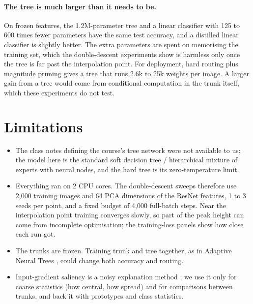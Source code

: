 \paragraph{The tree is much larger than it needs to be.} On frozen features, the 1.2M-parameter tree and a linear classifier with 125 to 600 times fewer parameters have the same test accuracy, and a distilled linear classifier is slightly better. The extra parameters are spent on memorising the training set, which the double-descent experiments show is harmless only once the tree is far past the interpolation point. For deployment, hard routing plus magnitude pruning gives a tree that runs 2.6k to 25k weights per image. A larger gain from a tree would come from conditional computation in the trunk itself, which these experiments do not test.

\section{Limitations}
\begin{itemize}
\item The class notes defining the course's tree network were not available to us; the model here is the standard soft decision tree / hierarchical mixture of experts with neural nodes, and the hard tree is its zero-temperature limit.
\item Everything ran on 2 CPU cores. The double-descent sweeps therefore use 2{,}000 training images and 64 PCA dimensions of the ResNet features, 1 to 3 seeds per point, and a fixed budget of 4{,}000 full-batch steps. Near the interpolation point training converges slowly, so part of the peak height can come from incomplete optimisation; the training-loss panels show how close each run got.
\item The trunks are frozen. Training trunk and tree together, as in Adaptive Neural Trees \cite{tanno2019}, could change both accuracy and routing.
\item Input-gradient saliency is a noisy explanation method \cite{adebayo2018}; we use it only for coarse statistics (how central, how spread) and for comparisons between trunks, and back it with prototypes and class statistics.
\end{itemize}

